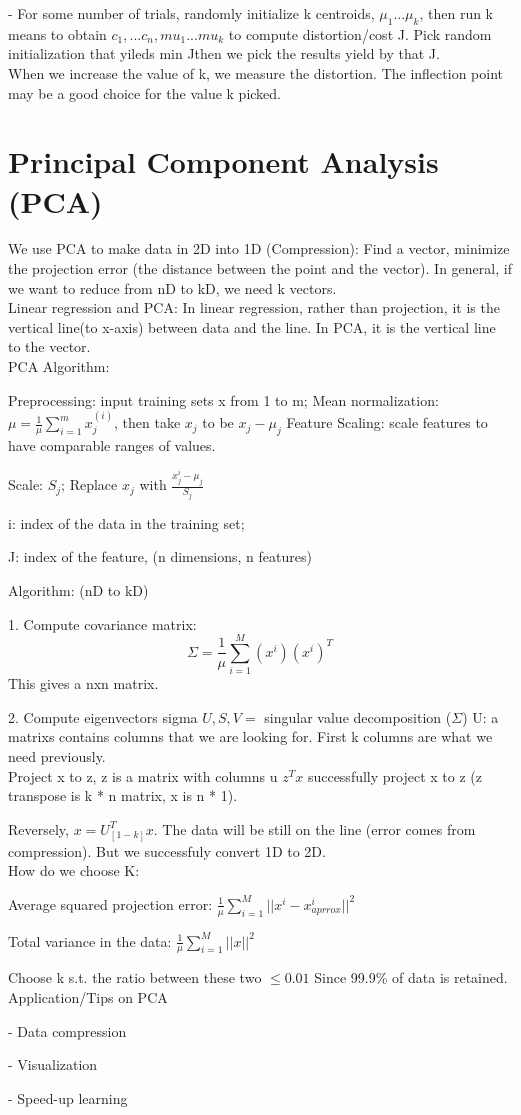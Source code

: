 \documentclass{article}
\begin{document}
- For some number of trials, randomly initialize k centroids, $\mu_1 ... \mu_k$, then run k means to obtain $c_1,...c_n, mu_1...mu_k$
to compute distortion/cost J. Pick random initialization that yileds min Jthen we pick the results yield by that J.\\

When we increase the value of k, we measure the distortion. The inflection point may be a good choice for the value k picked.

\section*{Principal Component Analysis (PCA)}
We use PCA to make data in 2D into 1D (Compression): Find a vector, minimize the projection error (the distance between the point and the vector). In general, if we want to reduce from nD to kD, we need k vectors.\\


Linear regression and PCA: In linear regression, rather than projection, it is the vertical line(to x-axis) between data and the line. In PCA, it is the vertical line to the vector. \\

PCA Algorithm:

Preprocessing: input training sets x from 1 to m;
Mean normalization: $\mu = \frac{1}{\mu}\sum_{i=1}^m x_j^{(i)}$, then take $x_j$ to be $x_j - \mu_j$
Feature Scaling: scale features to have comparable ranges of values. 

Scale: $S_j$; Replace $x_j$ with $\frac{x_j^i - \mu_j}{S_j}$

i: index of the data in the training set; 

J: index of the feature, (n dimensions, n features)

Algorithm: (nD to kD)

1. Compute covariance matrix:
\[\Sigma = \frac{1}{\mu} \sum_{i=1}^M (x^i)(x^i)^T\]
This gives a nxn matrix.

2. Compute eigenvectors sigma
$U,S,V =$ singular value decomposition ($\Sigma $)
U: a matrixs contains columns that we are looking for. First k columns are what we need previously.\\

Project x to z, z is a matrix with columns u
$z^T x$ successfully project x to z (z transpose is k * n matrix, x is n * 1). 

Reversely, $x = U_{[1-k]}^T x$. The data will be still on the line (error comes from compression). But we successfuly convert 1D to 2D.\\

How do we choose K: 

Average squared projection error: $\frac{1}{\mu} \sum_{i=1}^M ||x^i - x_{aprrox}^i||^2$

Total variance in the data: $\frac{1}{\mu}\sum_{i=1}^M ||x||^2$

Choose k s.t. the ratio between these two $\leq 0.01$ Since 99.9\% of data is retained.\\

Application/Tips on PCA

- Data compression

- Visualization

- Speed-up learning
\end{document}
